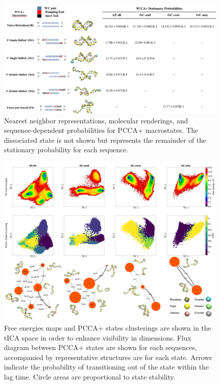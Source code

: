 \documentclass[journal=jpcbfk,manuscript=article]{achemso}
\begin{document}

\begin{figure}[ht!]
	\begin{center}
        \includegraphics[width=160mm, 
        scale=1]{Figs/figs_imp/allseq_states.png}
        \caption{Nearest neighbor representations, molecular renderings, and sequence-dependent probabilities for PCCA+ macrostates. The dissociated state is not shown but represents the remainder of the stationary probability for each sequence.}
        \label{fig:allseq_table}
	\end{center}
\end{figure}

\begin{figure}[hb!]
	\begin{center}
        \includegraphics[width=160mm, 
        scale=1]{Figs/figs_imp/allseq_transitions.png}
        \caption{Free energies maps and PCCA+ states clusterings are shown in the tICA space in order to enhance visibility in dimensions. Flux diagram between PCCA+ states are shown for each sequences, accompanied by representative structures are for each state. Arrows indicate the probability of transitioning out of the state within the lag time. Circle areas are proportional to state stability.}
        \label{fig:allseq_transition}
	\end{center}
\end{figure}
\end{document}
